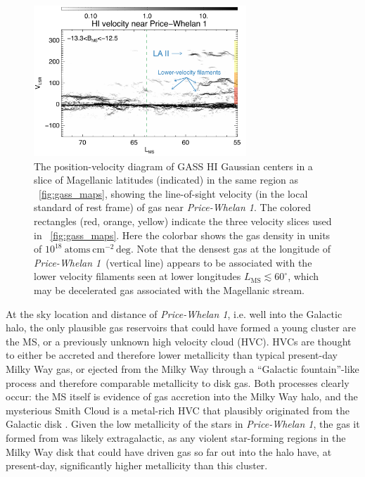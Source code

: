 \documentclass[twocolumn]{aastex62}
\newcommand{\feh}{\ensuremath{[\textrm{Fe} / \textrm{H}]}}
\newcommand{\hi}{H{\footnotesize I} }
\newcommand{\clustername}{\textsl{Price-Whelan 1}}
\begin{document}
\begin{figure}[t]
\centering
\includegraphics[width=8cm]{figures/gass_vlsrmlon.pdf}
\caption{The position-velocity diagram of GASS \hi Gaussian centers in a slice of Magellanic latitudes (indicated) in the same region as \figurename~\ref{fig:gass_maps}, showing the line-of-sight velocity (in the local standard of rest frame) of gas near \clustername.
The colored rectangles (red, orange, yellow) indicate the three velocity slices used in \figurename~\ref{fig:gass_maps}.
Here the colorbar shows the gas density in units of $10^{18}~\textrm{atoms}~\textrm{cm}^{-2}\,\textrm{deg}$.
Note that the densest gas at the longitude of \clustername\ (vertical line) appears to be associated with the lower velocity filaments seen at lower longitudes $L_{\textrm{MS}} \lesssim 60^\circ$, which may be decelerated gas associated with the Magellanic stream.
}
\label{fig:gasspv}
\end{figure}

At the sky location and distance of \clustername, i.e. well into the Galactic halo, the only plausible gas reservoirs that could have formed a young cluster are the MS, or a previously unknown high velocity cloud (HVC).
HVCs are thought to either be accreted and therefore lower metallicity than typical present-day Milky Way gas, or ejected from the Milky Way through a ``Galactic fountain''-like process and therefore comparable metallicity to disk gas.
Both processes clearly occur: the MS itself is evidence of gas accretion into the Milky Way halo, and the mysterious Smith Cloud \citep{Smith:1963} is a metal-rich \citep[$\feh \sim 0.5$][]{Fox:2016} HVC that plausibly originated from the Galactic disk \citep[e.g.,][]{Bregman:1980}.
Given the low metallicity of the stars in \clustername, the gas it formed from was likely extragalactic, as any violent star-forming regions in the Milky Way disk that could have driven gas so far out into the halo have, at present-day, significantly higher metallicity than this cluster.
\end{document}
